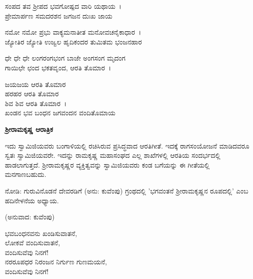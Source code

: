
\begin{myquote}
ಸಂಪದ ತವ ಶ‍್ರೀಪದ ಭವಗೋಷ್ಪದ ವಾರಿ ಯಥಾಯ~।\\ಪ್ರೇಮಾರ್ಪಣ ಸಮದರಶನ ಜಗಜನ ದುಃಖ ಜಾಯ
\end{myquote}


\begin{myquote}
ನಮೋ ನಮೋ ಪ್ರಭು ವಾಕ್ಯಮನಾತೀತ ಮನೋವಚನೈಕಾಧಾರ~।\\ಜ್ಯೋತಿರ ಜ್ಯೋತಿ ಉಜ್ವಲ ಹೃದಿಕಂದರ ತುಮಿತಮ ಭಂಜನಹಾರ
\end{myquote}


\begin{myquote}
ಧೇ ಧೇ ಧೇ ಲಂಗರಂಗಭಂಗ ಬಾಜೇ ಅಂಗಸಂಗ ಮೃದಂಗ\\ಗಾಯಿಛೇ ಛಂದ ಭಕತವೃಂದ, ಆರತಿ ತೊಮಾರ~।
\end{myquote}

\begin{myquote}
ಜಯಜಯ ಆರತಿ ತೊಮಾರ\\ಹರಹರ ಆರತಿ ತೊಮಾರ\\ಶಿವ ಶಿವ ಆರತಿ ತೊಮಾರ~।\\ಖಂಡನ ಭವ ಬಂಧನ ಜಗವಂದನ ವಂದಿತೊಮಾಯ
\end{myquote}


\begin{center}
\textbf{ಶ‍್ರೀರಾಮಕೃಷ್ಣ ಆರಾತ್ರಿಕ}
\end{center}

ಇದು ಸ್ವಾಮಿಜಿಯವರು ಬಂಗಾಳಿಯಲ್ಲಿ ರಚಿಸಿರುವ ಪ್ರಸಿದ್ಧವಾದ ಆರತಿಗೀತೆ. ಇದಕ್ಕೆ ರಾಗಸಂಯೋಜನೆ ಮಾಡಿದವರೂ ಸ್ವತಃ ಸ್ವಾಮಿಜಿಯವರೇ. ಇದನ್ನು ರಾಮಕೃಷ್ಣ ಮಹಾಸಂಘದ ಎಲ್ಲ ಶಾಖೆಗಳಲ್ಲಿ ಆರತಿಯ ಸಂದರ್ಭದಲ್ಲಿ ಹಾಡಲಾಗುತ್ತದೆ. ಶ‍್ರೀರಾಮಕೃಷ್ಣರ ವ್ಯಕ್ತಿತ್ವವನ್ನು ಸ್ವಾಮಿಜಿಯವರು ಕಂಡ ಬಗೆಯನ್ನು ಈ ಗೀತೆಯಲ್ಲಿ ಮನಗಾಣಬಹುದು.

ನೋಡಿ: ಗುರುವಿನೊಡನೆ ದೇವರಡಿಗೆ (ಅನು: ಕುವೆಂಪು) ಗ್ರಂಥದಲ್ಲಿ 'ಭಗವಂತನೆ ಶ‍್ರೀರಾಮಕೃಷ್ಣನ ರೂಪದಲ್ಲಿ' ಎಂಬ ಹದಿನೇಳನೆಯ ಅಧ್ಯಾಯ.

\begin{center}
(ಅನುವಾದ: ಕುವೆಂಪು)
\end{center}

\begin{myquote}
ಭವಬಂಧನವನು ಖಂಡಿಸುವಾತನೆ,\\ಲೋಕವೆ ವಂದಿಸುವಾತನೆ,\\ವಂದಿಸುವೆವು ನಿನಗೆ!\\ನರರೂಪಧರ ನಿರಂಜನ ನಿರ್ಗುಣ ಗುಣಮಯನೆ,\\ವಂದಿಸುವೆವು ನಿನಗೆ!
\end{myquote}

